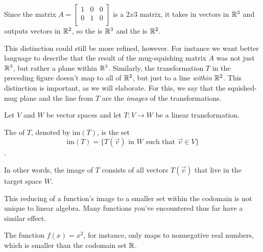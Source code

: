 \documentclass{ximera}
\begin{document}
Since the matrix $A=\begin{bmatrix}
  1&0&0\\
  0&1&0\\
\end{bmatrix}$ is a $2x3$ matrix, it takes in vectors in $\mathbb{R}^3$ and outputs vectors in $\mathbb{R}^2$, so the  is $\mathbb{R}^3$ and the  is $\mathbb{R}^2$.

This distinction could still be more refined, however. For instance we want better language to describe that the result of the mug-squishing matrix $A$ was not just $\mathbb{R}^3$, but rather a plane within $\mathbb{R}^3$. Similarly, the transformation $T$ in the preceding figure doesn't map to all of $\mathbb{R}^2$, but just to a line \emph{within} $\mathbb{R}^2$. This distinction is important, as we will elaborate. For this, we say that the squished-mug plane and the line from $T$ are the \emph{images} of the transformations.

\begin{definition}\label{def:imageofT}
Let $V$ and $W$ be vector spaces and let $T:V\rightarrow W$ be a linear transformation.  

The  of $T$, denoted by $\mbox{im}(T)$, is the set
$$\mbox{im}(T)=\{T(\vec{v})\text{ in }W\text{ such that }\vec{v}\in V\}$$.

In other words, the image of $T$ consists of all vectors $T(\vec{v})$ that live in the target space $W$.
\end{definition}



\begin{remark}
  This reducing of a function's image to a smaller set within the codomain is not unique to linear algebra. Many functions you've encountered thus far have a similar effect. 

  The function $f(x)=x^2$, for instance, only maps to nonnegative real numbers, which is smaller than the codomain set $\mathbb{R}$.
\begin{center}
\end{center}
\end{remark}
 
\end{document}

